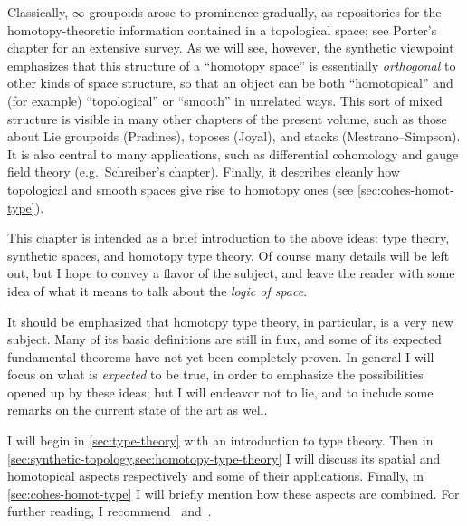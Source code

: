 \documentclass[12pt]{article}
\def\oo{\ensuremath{\infty}}
\numberwithin{equation}{section}
\begin{document}
Classically, \oo-groupoids arose to prominence gradually, as repositories for the homotopy-theoretic information contained in a topological space; see Porter's chapter for an extensive survey.
As we will see, however, the synthetic viewpoint emphasizes that this structure of a ``homotopy space'' is essentially \emph{orthogonal} to other kinds of space structure, so that an object can be both ``homotopical'' and (for example) ``topological'' or ``smooth'' in unrelated ways.
This sort of mixed structure is visible in many other chapters of the present volume, such as those about Lie groupoids (Pradines), toposes (Joyal), and stacks (Mestrano--Simpson).
It is also central to many applications, such as differential cohomology and gauge field theory (e.g.\ Schreiber's chapter).
Finally, it describes cleanly how topological and smooth spaces give rise to homotopy ones (see \cref{sec:cohes-homot-type}).

This chapter is intended as a brief introduction to the above ideas: type theory, synthetic spaces, and homotopy type theory.
Of course many details will be left out, but I hope to convey a flavor of the subject, and leave the reader with some idea of what it means to talk about the \emph{logic of space}.

It should be emphasized that homotopy type theory, in particular, is a very new subject.
Many of its basic definitions are still in flux, and some of its expected fundamental theorems have not yet been completely proven.
In general I will focus on what is \emph{expected} to be true, %
in order to emphasize the possibilities opened up by these ideas; but I will endeavor not to lie, and to include some remarks on the current state of the art as well.

I will begin in \cref{sec:type-theory} with an introduction to type theory.
Then in \cref{sec:synthetic-topology,sec:homotopy-type-theory} I will discuss its spatial and homotopical aspects respectively and some of their applications.
Finally, in \cref{sec:cohes-homot-type} I will briefly mention how these aspects are combined. %
For further reading, I recommend~\cite{awodey:tt-and-htpy,apw:vvu-hott,pw:hottvvuf,shulman:synhott} and~\cite{hottbook}.
\end{document}
